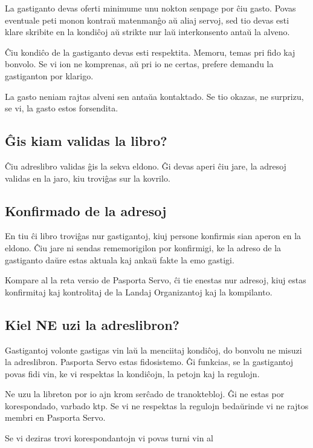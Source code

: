 {La gastiganto devas oferti minimume unu nokton senpage por ĉiu gasto. Povas eventuale peti monon kontraŭ matenmanĝo aŭ aliaj servoj, sed tio devas esti klare skribite en la kondiĉoj aŭ strikte nur laŭ interkonsento antaŭ la alveno.

Ĉiu kondiĉo de la gastiganto devas esti respektita. Memoru, temas pri fido kaj bonvolo. Se vi ion ne komprenas, aŭ pri io ne certas, prefere demandu la gastiganton por klarigo.

La gasto neniam rajtas alveni sen antaŭa kontaktado. Se tio okazas, ne surprizu, se vi, la gasto estos forsendita.


\subsection{Ĝis kiam validas la libro?}

Ĉiu adreslibro validas ĝis la sekva eldono. Ĝi devas aperi ĉiu jare, la adresoj validas en la jaro, kiu troviĝas sur la kovrilo.

\subsection{Konfirmado de la adresoj}

En tiu ĉi libro troviĝas nur gastigantoj, kiuj persone konfirmis sian aperon en la eldono. Ĉiu jare ni sendas rememorigilon por konfirmigi, ke la adreso de la gastiganto daŭre estas aktuala kaj ankaŭ fakte la emo gastigi.

Kompare al la reta versio de Pasporta Servo, ĉi tie enestas nur adresoj, kiuj estas konfirmitaj kaj kontrolitaj de la Landaj Organizantoj kaj la kompilanto.


\subsection*{Kiel NE uzi la adreslibron?}

Gastigantoj volonte gastigas vin laŭ la menciitaj kondiĉoj, do bonvolu ne misuzi la adreslibron. Pasporta Servo estas fidosistemo. Ĝi funkcias, se la gastigantoj povas fidi vin, ke vi respektas la kondiĉojn, la petojn kaj la regulojn.

Ne uzu la libreton por io ajn krom serĉado de tranoktebloj. Ĝi ne estas por korespondado, varbado ktp. Se vi ne respektas la regulojn bedaŭrinde vi ne rajtos membri en Pasporta Servo.

Se vi deziras trovi korespondantojn vi povas turni vin al

}
